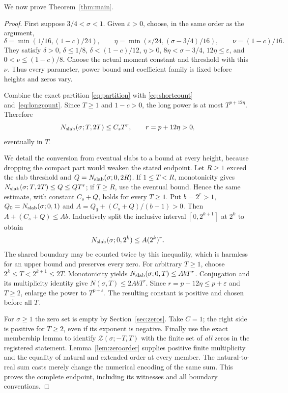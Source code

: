 \documentclass[11pt,a4paper]{article}
\numberwithin{equation}{section}
\theoremstyle{definition}
\begin{document}
\par\noindent We now prove Theorem~\ref{thm:main}.
\begin{proof}
First suppose $3/4<\sigma<1$. Given $\varepsilon>0$, choose, in the same
order as the argument,
\[
 \delta=\min(1/16,(1-c)/24),\qquad
 \eta=\min(\varepsilon/24,(\sigma-3/4)/16),\qquad
 \nu=(1-c)/16.
\]
They satisfy $\delta>0$, $\delta\le1/8$, $\delta<(1-c)/12$,
$\eta>0$, $8\eta<\sigma-3/4$, $12\eta\le\varepsilon$,
and $0<\nu\le(1-c)/8$. Choose the actual moment constant and threshold
with this $\nu$. Thus every parameter, power bound and coefficient family
is fixed before heights and zeros vary.

Combine the exact partition \eqref{eq:partition} with
\eqref{eq:shortcount} and~\eqref{eq:longcount}. Since $T\ge1$ and $1-c>0$,
the long power is at most $T^{p+12\eta}$. Therefore
\[
 N_{\rm slab}(\sigma;T,2T)\le C_s T^{r},\qquad r=p+12\eta>0,
\]
eventually in $T$.

We detail the conversion from eventual slabs to a bound at every
height, because dropping the compact part would weaken the stated endpoint.
Let $R\ge1$ exceed the slab threshold and
$Q=N_{\rm slab}(\sigma;0,2R)$. If $1\le T<R$, monotonicity gives
$N_{\rm slab}(\sigma;T,2T)\le Q\le QT^r$; if $T\ge R$, use the eventual
bound. Hence the same estimate, with constant $C_s+Q$, holds for every
$T\ge1$.
Put $b=2^r>1$, $Q_0=N_{\rm slab}(\sigma;0,1)$ and
$A=Q_0+(C_s+Q)/(b-1)>0$. Then $A+(C_s+Q)\le Ab$.
Inductively split the inclusive interval $[0,2^{k+1}]$ at $2^k$ to obtain
\[
 N_{\rm slab}(\sigma;0,2^k)\le A(2^k)^r.
\]
The shared boundary may be counted twice by this inequality, which is harmless
for an upper bound and preserves every zero. For arbitrary $T\ge1$, choose
$2^k\le T<2^{k+1}\le2T$. Monotonicity yields
$N_{\rm slab}(\sigma;0,T)\le AbT^r$.
Conjugation and its multiplicity identity give
$N(\sigma,T)\le2AbT^r$.
Since $r=p+12\eta\le p+\varepsilon$ and $T\ge2$, enlarge the power to
$T^{p+\varepsilon}$. The resulting constant is positive and chosen before
all $T$.

For $\sigma\ge1$ the zero set is empty by Section~\ref{sec:zeros}.
Take $C=1$; the right side is positive for $T\ge2$, even if its exponent
is negative. Finally use the exact membership lemma to identify
$\mathcal Z(\sigma;-T,T)$ with the finite set of \emph{all} zeros in the
registered statement. Lemma~\ref{lem:zeroorder} supplies positive finite
multiplicity and the equality of natural and extended order at every member.
The natural-to-real sum casts merely change the numerical encoding
of the same sum. This proves the complete endpoint, including its witnesses
and all boundary conventions.
\end{proof}
\end{document}
